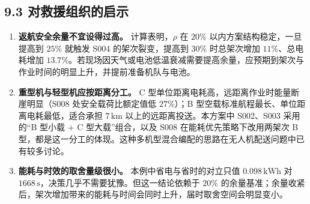 \documentclass[withoutpreface,bwprint]{format}
\begin{document}
\subsection{9.3 对救援组织的启示}
\begin{enumerate}[leftmargin=*]
    \item \textbf{返航安全余量不宜设得过高。} 计算表明，$\rho$ 在 $20\%$ 以内方案结构稳定，一旦提高到 $25\%$ 就触发 S004 的架次裂变，提高到 $30\%$ 时总架次增加 $11\%$、总电耗增加 $13.7\%$。若现场因天气或电池低温衰减需要提高余量，应预期到架次与作业时间的明显上升，并提前准备机队与电池。
    \item \textbf{重型机与轻型机应按距离分工。} C 型单位距离电耗高，远距离作业时能量断崖明显（S008 处安全载荷比额定值低 $27\%$）；B 型空载标准航程最长、单位距离电耗最低，适合承担 $7\,\text{km}$ 以上的远距离投送。本方案中 S002、S003 采用的“B 型小载 $+$ C 型大载”组合，以及 S008 在能耗优先策略下改用两架次 B 型，都是这一分工的体现。这种多机型混合编配的思路在无人机配送问题中已有较多讨论\cite{moshref2020}。
    \item \textbf{能耗与时效的取舍量级很小。} 本例中省电与省时的对立只值 $0.098\,\text{kWh}$ 对 $1668\,\text{s}$，决策几乎不需要犹豫。但这一结论依赖于 $20\%$ 的余量基准；余量收紧后，架次增加带来的能耗与时间会同时上升，届时取舍空间会明显变小。
\end{enumerate}
\end{document}
